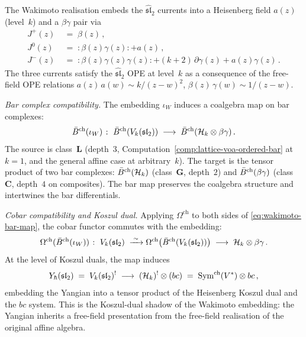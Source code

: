 \begin{computation}%
\label{comp:wakimoto-bar-cobar}%
%
%
%
The Wakimoto realisation embeds the $\widehat{\mathfrak{sl}}_2$
currents into a Heisenberg field $a(z)$ (level~$k$) and a
$\beta\gamma$ pair via
\begin{equation}\label{eq:wakimoto-embedding}
\begin{aligned}
J^+(z) &\;=\; \beta(z)\,, \\
J^0(z) &\;=\; {:}\beta(z)\gamma(z){:} + a(z)\,, \\
J^-(z) &\;=\; {:}\beta(z)\gamma(z)\gamma(z){:}
 + (k+2)\,\partial\gamma(z)
 + a(z)\gamma(z)\,.
\end{aligned}
\end{equation}
The three currents satisfy the $\widehat{\mathfrak{sl}}_2$ OPE
at level~$k$ as a consequence of the free-field OPE relations
$a(z)\,a(w) \sim k/(z-w)^2$,\;
$\beta(z)\,\gamma(w) \sim 1/(z-w)$.

\smallskip
\noindent
\emph{Bar complex compatibility.}
The embedding $\iota_W$ induces a coalgebra map on bar
complexes:
\begin{equation}\label{eq:wakimoto-bar-map}
\bar{B}^{\mathrm{ch}}(\iota_W) \;\colon\;
\bar{B}^{\mathrm{ch}}(V_k(\mathfrak{sl}_2))
\;\longrightarrow\;
\bar{B}^{\mathrm{ch}}(\mathcal{H}_k \otimes \beta\gamma)\,.
\end{equation}
The source is class~$\mathbf{L}$ (depth~$3$,
Computation~\ref{comp:lattice-voa-ordered-bar} at
$k = 1$, and the general affine case at arbitrary~$k$).
The target is the tensor product of two bar complexes:
$\bar{B}^{\mathrm{ch}}(\mathcal{H}_k)$ (class~$\mathbf{G}$, depth~$2$)
and $\bar{B}^{\mathrm{ch}}(\beta\gamma)$ (class~$\mathbf{C}$,
depth~$4$ on composites).
The bar map preserves the coalgebra structure and
intertwines the bar differentials.

\smallskip
\noindent
\emph{Cobar compatibility and Koszul dual.}
Applying $\Omega^{\mathrm{ch}}$ to both sides of
\eqref{eq:wakimoto-bar-map}, the cobar functor commutes
with the embedding:
\[
\Omega^{\mathrm{ch}}(\bar{B}^{\mathrm{ch}}(\iota_W))
\;\colon\;
V_k(\mathfrak{sl}_2)
\;\xrightarrow{\;\sim\;}
\Omega^{\mathrm{ch}}\bigl(
\bar{B}^{\mathrm{ch}}(V_k(\mathfrak{sl}_2))\bigr)
\;\longrightarrow\;
\mathcal{H}_k \otimes \beta\gamma\,.
\]
At the level of Koszul duals, the map induces
\begin{equation}\label{eq:wakimoto-koszul}
Y_\hbar(\mathfrak{sl}_2)
\;=\;
V_k(\mathfrak{sl}_2)^!
\;\longrightarrow\;
(\mathcal{H}_k)^! \otimes (bc)
\;=\;
\mathrm{Sym}^{\mathrm{ch}}(V^*) \otimes bc\,,
\end{equation}
embedding the Yangian into a tensor product of the Heisenberg
Koszul dual and the $bc$ system. This is the Koszul-dual
shadow of the Wakimoto embedding: the Yangian inherits a
free-field presentation from the free-field realisation
of the original affine algebra.


\end{computation}
